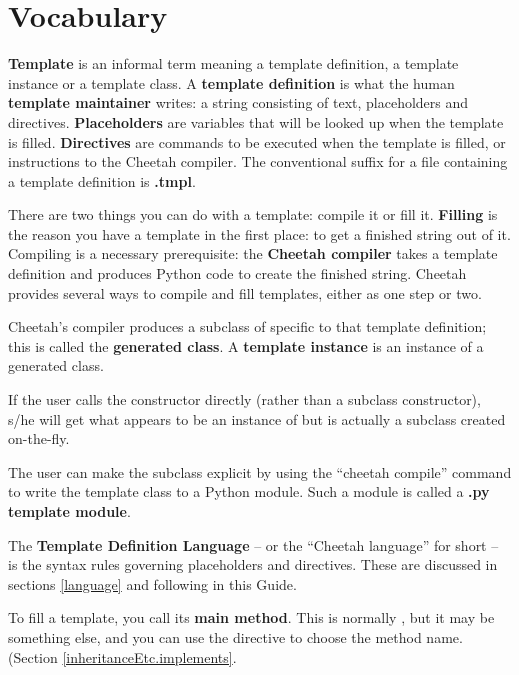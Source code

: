 \section{Vocabulary}
\label{glossary}
\label{vocabulary}

{\bf Template} is an informal term meaning a template definition, a
template instance or a template class.  A {\bf template definition} is what
the human {\bf template maintainer} writes: a string consisting of text,
placeholders and directives.  {\bf Placeholders} are variables that will be
looked up when the template is filled.  {\bf Directives} are commands to be
executed when the template is filled, or instructions to the Cheetah compiler.  
The conventional suffix for a file containing a template definition is 
{\bf .tmpl}.

There are two things you can do with a template: compile it or fill it.
{\bf Filling} is the reason you have a template in the first place:
to get a finished string out of it.  Compiling is a necessary prerequisite: the
{\bf Cheetah compiler} takes a template definition and produces Python code
to create the finished string.  Cheetah provides several ways to compile
and fill templates, either as one step or two.

Cheetah's compiler produces a subclass of 
specific to that template definition; this is called the {\bf generated
class}.  A {\bf template instance} is an instance of a generated class.

If the user calls the  constructor directly (rather than a
subclass constructor), s/he will get what appears to be an instance of 
 but is actually a subclass created on-the-fly.

The user can make the subclass explicit by using the ``cheetah compile''
command to write the template class to a Python module.  Such a module is
called a {\bf .py template module}.

The {\bf Template Definition Language} -- or the ``Cheetah language'' for short
-- is the syntax rules governing placeholders and directives.  These are
discussed in sections \ref{language} and following in this Guide.

To fill a template, you call its {\bf main method}.  This is normally
, but it may be something else, and you can use the
 directive to choose the method name.  (Section
\ref{inheritanceEtc.implements}.

